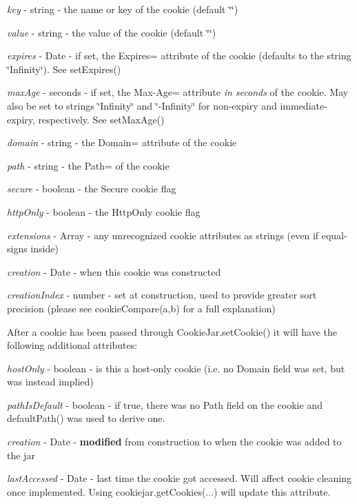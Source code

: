 \begin{DoxyItemize}
\item {\itshape key} -\/ string -\/ the name or key of the cookie (default \char`\"{}\char`\"{})
\item {\itshape value} -\/ string -\/ the value of the cookie (default \char`\"{}\char`\"{})
\item {\itshape expires} -\/ {\ttfamily Date} -\/ if set, the {\ttfamily Expires=} attribute of the cookie (defaults to the string {\ttfamily \char`\"{}\+Infinity\char`\"{}}). See {\ttfamily set\+Expires()}
\item {\itshape max\+Age} -\/ seconds -\/ if set, the {\ttfamily Max-\/\+Age=} attribute {\itshape in seconds} of the cookie. May also be set to strings {\ttfamily \char`\"{}\+Infinity\char`\"{}} and {\ttfamily \char`\"{}-\/\+Infinity\char`\"{}} for non-\/expiry and immediate-\/expiry, respectively. See {\ttfamily set\+Max\+Age()}
\item {\itshape domain} -\/ string -\/ the {\ttfamily Domain=} attribute of the cookie
\item {\itshape path} -\/ string -\/ the {\ttfamily Path=} of the cookie
\item {\itshape secure} -\/ boolean -\/ the {\ttfamily Secure} cookie flag
\item {\itshape http\+Only} -\/ boolean -\/ the {\ttfamily Http\+Only} cookie flag
\item {\itshape extensions} -\/ {\ttfamily Array} -\/ any unrecognized cookie attributes as strings (even if equal-\/signs inside)
\item {\itshape creation} -\/ {\ttfamily Date} -\/ when this cookie was constructed
\item {\itshape creation\+Index} -\/ number -\/ set at construction, used to provide greater sort precision (please see {\ttfamily cookie\+Compare(a,b)} for a full explanation)
\end{DoxyItemize}

After a cookie has been passed through {\ttfamily Cookie\+Jar.\+set\+Cookie()} it will have the following additional attributes\+:


\begin{DoxyItemize}
\item {\itshape host\+Only} -\/ boolean -\/ is this a host-\/only cookie (i.\+e. no Domain field was set, but was instead implied)
\item {\itshape path\+Is\+Default} -\/ boolean -\/ if true, there was no Path field on the cookie and {\ttfamily default\+Path()} was used to derive one.
\item {\itshape creation} -\/ {\ttfamily Date} -\/ {\bfseries modified} from construction to when the cookie was added to the jar
\item {\itshape last\+Accessed} -\/ {\ttfamily Date} -\/ last time the cookie got accessed. Will affect cookie cleaning once implemented. Using {\ttfamily cookiejar.\+get\+Cookies(...)} will update this attribute.
\end{DoxyItemize}


